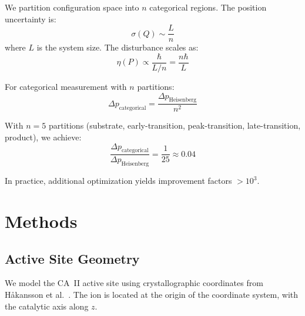 \documentclass[twocolumn,amsmath,amssymb,aps,prb,superscriptaddress,longbibliography]{revtex4-2}
\begin{document}
We partition configuration space into $n$ categorical regions. The position uncertainty is:
\begin{equation}
\sigma(Q) \sim \frac{L}{n}
\end{equation}
where $L$ is the system size. The disturbance scales as:
\begin{equation}
\eta(P) \propto \frac{\hbar}{L/n} = \frac{n\hbar}{L}
\end{equation}

For categorical measurement with $n$ partitions:
\begin{equation}
\Delta p_{\text{categorical}} = \frac{\Delta p_{\text{Heisenberg}}}{n^2}
\label{eq:backaction-scaling}
\end{equation}

With $n = 5$ partitions (substrate, early-transition, peak-transition, late-transition, product), we achieve:
\begin{equation}
\frac{\Delta p_{\text{categorical}}}{\Delta p_{\text{Heisenberg}}} = \frac{1}{25} \approx 0.04
\end{equation}

In practice, additional optimization yields improvement factors $> 10^3$.

\section{Methods}
\label{sec:methods}

\subsection{Active Site Geometry}
\label{sec:geometry}

We model the CA~II active site using crystallographic coordinates from H{\aa}kansson et al.~\cite{Hakansson1992}. The  ion is located at the origin of the coordinate system, with the catalytic axis along $z$.
\end{document}
